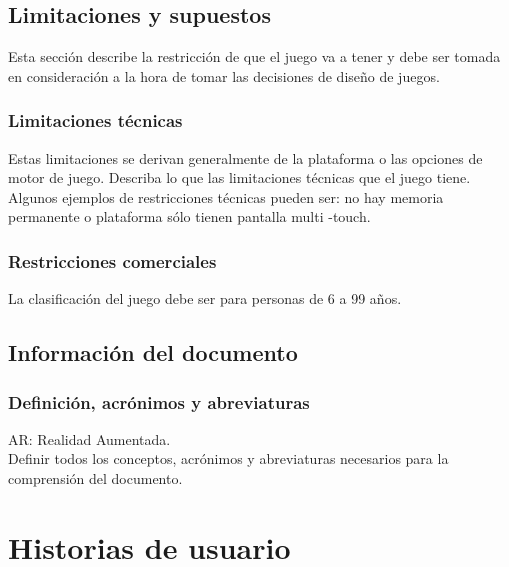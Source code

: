 \subsection{Limitaciones y supuestos}
Esta sección describe la restricción de que el juego va a tener y debe ser tomada en consideración a la hora de tomar las decisiones de diseño de juegos.

\subsubsection{Limitaciones técnicas}
Estas limitaciones se derivan generalmente de la plataforma o las opciones de motor de juego. Describa lo que las limitaciones técnicas que el juego tiene. Algunos ejemplos de restricciones técnicas pueden ser: no hay memoria permanente o plataforma sólo tienen pantalla multi -touch.

\subsubsection{Restricciones comerciales}
La clasificación del juego debe ser para personas de 6 a 99 años.

\subsection{Información del documento}
\subsubsection{Definición, acrónimos y abreviaturas}
AR: Realidad Aumentada.\\

Definir todos los conceptos, acrónimos y abreviaturas necesarios para la comprensión del documento.


\section{Historias de usuario} \label{historias-usuario}

